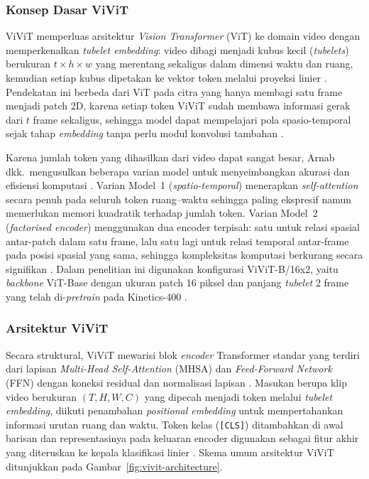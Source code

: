 \subsubsection{Konsep Dasar ViViT} \label{II.ViViT.1}
ViViT memperluas arsitektur \textit{Vision Transformer} (ViT) \cite{Dosovitskiy2021} ke domain video dengan memperkenalkan \textit{tubelet embedding}: video dibagi menjadi kubus kecil (\textit{tubelets}) berukuran $t \times h \times w$ yang merentang sekaligus dalam dimensi waktu dan ruang, kemudian setiap kubus dipetakan ke vektor token melalui proyeksi linier \cite{Arnab2021}. Pendekatan ini berbeda dari ViT pada citra yang hanya membagi satu frame menjadi patch 2D, karena setiap token ViViT sudah membawa informasi gerak dari $t$ frame sekaligus, sehingga model dapat mempelajari pola spasio-temporal sejak tahap \textit{embedding} tanpa perlu modul konvolusi tambahan \cite{Arnab2021}.\par

Karena jumlah token yang dihasilkan dari video dapat sangat besar, Arnab dkk.\ mengusulkan beberapa varian model untuk menyeimbangkan akurasi dan efisiensi komputasi \cite{Arnab2021}. Varian Model~1 (\textit{spatio-temporal}) menerapkan \textit{self-attention} secara penuh pada seluruh token ruang--waktu sehingga paling ekspresif namun memerlukan memori kuadratik terhadap jumlah token. Varian Model~2 (\textit{factorised encoder}) menggunakan dua encoder terpisah: satu untuk relasi spasial antar-patch dalam satu frame, lalu satu lagi untuk relasi temporal antar-frame pada posisi spasial yang sama, sehingga kompleksitas komputasi berkurang secara signifikan \cite{Arnab2021}. Dalam penelitian ini digunakan konfigurasi ViViT-B/16x2, yaitu \textit{backbone} ViT-Base dengan ukuran patch 16 piksel dan panjang \textit{tubelet} 2 frame yang telah di-\textit{pretrain} pada Kinetics-400 \cite{Arnab2021}.\par

\subsubsection{Arsitektur ViViT} \label{II.ViViT.2}
Secara struktural, ViViT mewarisi blok \textit{encoder} Transformer standar yang terdiri dari lapisan \textit{Multi-Head Self-Attention} (MHSA) dan \textit{Feed-Forward Network} (FFN) dengan koneksi residual dan normalisasi lapisan \cite{Vaswani2023,Arnab2021}. Masukan berupa klip video berukuran $(T, H, W, C)$ yang dipecah menjadi token melalui \textit{tubelet embedding}, diikuti penambahan \textit{positional embedding} untuk mempertahankan informasi urutan ruang dan waktu. Token kelas (\texttt{[CLS]}) ditambahkan di awal barisan dan representasinya pada keluaran encoder digunakan sebagai fitur akhir yang diteruskan ke kepala klasifikasi linier \cite{Arnab2021}. Skema umum arsitektur ViViT ditunjukkan pada Gambar~\ref{fig:vivit-architecture}.\par

